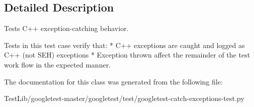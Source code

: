 \subsection{Detailed Description}
\begin{DoxyVerb}Tests C++ exception-catching behavior.

   Tests in this test case verify that:
   * C++ exceptions are caught and logged as C++ (not SEH) exceptions
   * Exception thrown affect the remainder of the test work flow in the
     expected manner.
\end{DoxyVerb}
 

The documentation for this class was generated from the following file\+:\begin{DoxyCompactItemize}
\item 
Test\+Lib/googletest-\/master/googletest/test/googletest-\/catch-\/exceptions-\/test.\+py\end{DoxyCompactItemize}
